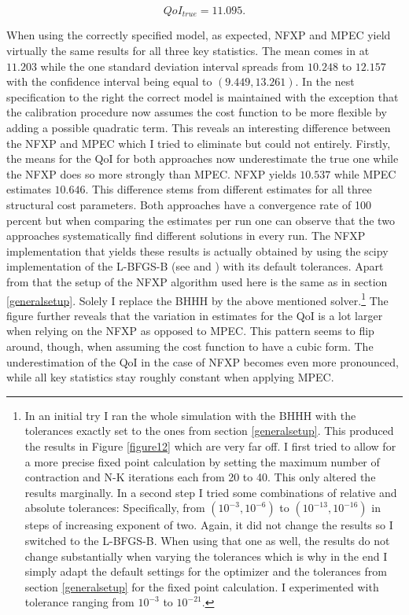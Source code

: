 \begin{equation*}
	QoI_{true} = 11.095.
\end{equation*}

When using the correctly specified model, as expected, NFXP and MPEC yield virtually the same results for all three key statistics. The mean comes in at $11.203$ while the one standard deviation interval spreads from $10.248$ to $12.157$ with the confidence interval being equal to $(9.449, 13.261)$. In the nest specification to the right the correct model is maintained with the exception that the calibration procedure now assumes the cost function to be more flexible by adding a possible quadratic term. This reveals an interesting difference between the NFXP and MPEC which I tried to eliminate but could not entirely. Firstly, the means for the QoI for both approaches now underestimate the true one while the NFXP does so more strongly than MPEC. NFXP yields $10.537$ while MPEC estimates $10.646$. This difference stems from different estimates for all three structural cost parameters. Both approaches have a convergence rate of 100 percent but when comparing the estimates per run one can observe that the two approaches systematically find different solutions in every run. The NFXP implementation that yields these results is actually obtained by using the scipy implementation of the L-BFGS-B (see \cite{Byrd.1997} and \cite{scipy.2020}) with its default tolerances. Apart from that the setup of the NFXP algorithm used here is the same as in section \ref{generalsetup}. Solely I replace the BHHH by the above mentioned solver.\footnote{In an initial try I ran the whole simulation with the BHHH with the tolerances exactly set to the ones from section \ref{generalsetup}. This produced the results in Figure \ref{figure12} which are very far off. I first tried to allow for a more precise fixed point calculation by setting the maximum number of contraction and N-K iterations each from 20 to 40. This only altered the results marginally. In a second step I tried some combinations of relative and absolute tolerances: Specifically, from $(10^{-3}, 10^{-6})$ to $(10^{-13}, 10^{-16})$ in steps of increasing exponent of two. Again, it did not change the results so I switched to the L-BFGS-B. When using that one as well, the results do not change substantially when varying the tolerances which is why in the end I simply adapt the default settings for the optimizer and the tolerances from section \ref{generalsetup} for the fixed point calculation. I experimented with tolerance ranging from $10^{-3}$ to $10^{-21}$.} The figure further reveals that the variation in estimates for the QoI is a lot larger when relying on the NFXP as opposed to MPEC. This pattern seems to flip around, though, when assuming the cost function to have a cubic form. The underestimation of the QoI in the case of NFXP becomes even more pronounced, while all key statistics stay roughly constant when applying MPEC.

